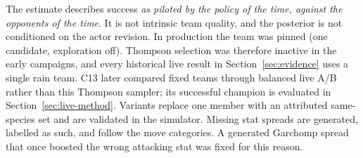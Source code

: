 The estimate describes success \emph{as piloted by the policy of the time,
against the opponents of the time}. It is not intrinsic team quality, and the
posterior is not conditioned on the actor revision. In production the team
was pinned (one candidate, exploration off). Thompson selection was therefore
inactive in the early campaigns, and every historical live result in
Section~\ref{sec:evidence} uses a single rain team. C13 later compared fixed
teams through balanced live A/B rather than this Thompson sampler; its
successful champion is evaluated in Section~\ref{sec:live-method}. Variants replace one
member with an attributed same-species set and are validated in the
simulator. Missing stat spreads are generated, labelled as such, and follow
the move categories. A generated Garchomp spread that once boosted the wrong
attacking stat was fixed for this reason.


